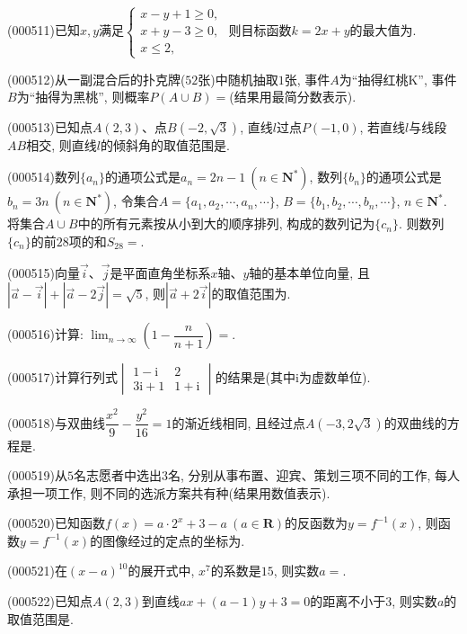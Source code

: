 \item (000511)已知$x, y$满足$\begin{cases}x-y+1 \ge 0, \\ x+y-3 \ge 0, \\  x\le 2, \end{cases}$ 则目标函数$k=2x+y$的最大值为.
\item (000512)从一副混合后的扑克牌($52$张)中随机抽取$1$张, 事件$A$为``抽得红桃K'', 事件$B$为``抽得为黑桃'', 则概率$P(A\cup B)=$(结果用最简分数表示).
\item (000513)已知点$A(2,3)$、点$B(-2,\sqrt3)$, 直线$l$过点$P(-1,0)$, 若直线$l$与线段$AB$相交, 则直线$l$的倾斜角的取值范围是.
\item (000514)数列$\{a_n\}$的通项公式是$a_n=2n-1\ (n\in \mathbf{N}^*)$, 数列$\{b_n\}$的通项公式是$b_n=3n \ (n\in \mathbf{N}^*)$, 令集合$A=\{a_1,a_2,\cdots,a_n,\cdots\}$, $B=\{b_1,b_2,\cdots,b_n,\cdots\}$, $n\in \mathbf{N}^*$. 将集合$A\cup B$中的所有元素按从小到大的顺序排列, 构成的数列记为$\{c_n\}$. 则数列$\{c_n\}$的前$28$项的和$S_{28}=$.
\item (000515)向量$\overrightarrow{i}$、$\overrightarrow{j}$是平面直角坐标系$x$轴、$y$轴的基本单位向量, 且$|\overrightarrow a-\overrightarrow i|+|\overrightarrow a-2\overrightarrow j|=\sqrt5$, 则$|\overrightarrow a+2 \overrightarrow i|$的取值范围为.
\item (000516)计算: $\displaystyle\lim_{n\to\infty}(1-\dfrac n{n+1})=$.
\item (000517)计算行列式$\begin{vmatrix} 1-\mathrm{i} & 2 \\ 3\mathrm{i}+1 & 1+\mathrm{i}\end{vmatrix}$的结果是(其中$\mathrm{i}$为虚数单位).
\item (000518)与双曲线$\dfrac{x^2}9-\dfrac{y^2}{16}=1$的渐近线相同, 且经过点$A(-3,2 \sqrt3)$的双曲线的方程是.
\item (000519)从$5$名志愿者中选出$3$名, 分别从事布置、迎宾、策划三项不同的工作, 每人承担一项工作, 则不同的选派方案共有种(结果用数值表示).
\item (000520)已知函数$f(x)=a\cdot 2^x+3-a\ (a\in \mathbf{R})$的反函数为$y=f^{-1}(x)$, 则函数$y=f^{-1}(x)$的图像经过的定点的坐标为.
\item (000521)在$(x-a)^{10}$的展开式中, $x^7$的系数是$15$, 则实数$a=$.
\item (000522)已知点$A(2,3)$到直线$ax+(a-1)y+3=0$的距离不小于$3$, 则实数$a$的取值范围是.
